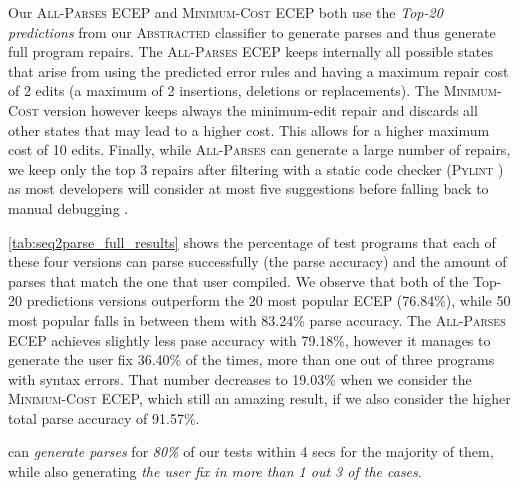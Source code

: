 Our \textsc{All-Parses} ECEP and \textsc{Minimum-Cost} ECEP both use the
\emph{Top-20 predictions} from our \textsc{Abstracted} classifier to generate
parses and thus generate full program repairs. The \textsc{All-Parses} ECEP
keeps internally all possible states that arise from using the predicted error
rules and having a maximum repair cost of 2 edits (\ie a maximum of 2
insertions, deletions or replacements). The \textsc{Minimum-Cost} version
however keeps always the minimum-edit repair and discards all other states that
may lead to a higher cost. This allows for a higher maximum cost of 10 edits.
Finally, while \textsc{All-Parses} can generate a large number of repairs, we
keep only the top 3 repairs after filtering with a static code checker
(\textsc{Pylint} \citep{pylint2022}) as most developers will consider at most five
suggestions before falling back to manual debugging \citep{Kochhar2016-oc,
Parnin2011-ce}.

\autoref{tab:seq2parse_full_results} shows the percentage of test programs that
each of these four versions can parse successfully (\ie the parse accuracy) and
the amount of parses that match the one that user compiled. We observe that both
of the Top-20 predictions versions outperform the 20 most popular ECEP
(76.84\%), while 50 most popular falls in between them with 83.24\% parse
accuracy. The \textsc{All-Parses} ECEP achieves slightly less pase accuracy with
79.18\%, however it manages to generate the user fix 36.40\% of the times, \ie
more than one out of three programs with syntax errors. That number decreases to
19.03\% when we consider the \textsc{Minimum-Cost} ECEP, which still an amazing
result, if we also consider the higher total parse accuracy of 91.57\%.

\begin{framed}
  \noindent \toolname can \emph{generate parses} for \emph{80\%} of our tests
  within 4 secs for the majority of them, while also generating \emph{the user
  fix in more than 1 out 3 of the cases}.
\end{framed}




